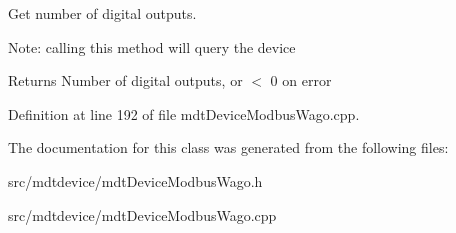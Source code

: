 Get number of digital outputs. 

Note: calling this method will query the device

\begin{DoxyReturn}{Returns}
Number of digital outputs, or $<$ 0 on error 
\end{DoxyReturn}


Definition at line 192 of file mdtDeviceModbusWago.cpp.



The documentation for this class was generated from the following files:\begin{DoxyCompactItemize}
\item 
src/mdtdevice/mdtDeviceModbusWago.h\item 
src/mdtdevice/mdtDeviceModbusWago.cpp\end{DoxyCompactItemize}
